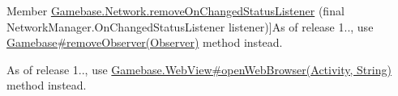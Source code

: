 \begin{DoxyRefList}
%
Member \hyperlink{classcom_1_1toast_1_1android_1_1gamebase_1_1_gamebase_1_1_network_a295dcc9a385185370586734384c49c43}{Gamebase.Network.remove\+On\+Changed\+Status\+Listener} (final Network\+Manager.\+On\+Changed\+Status\+Listener listener)]As of release 1.., use \hyperlink{classcom_1_1toast_1_1android_1_1gamebase_1_1_gamebase_af13c08393910fc1b5dac3b5209f461c8}{Gamebase\#remove\+Observer(\+Observer)} method instead.  
\item[\label{deprecated__deprecated000005}%
\Hypertarget{deprecated__deprecated000005}%
Member \hyperlink{classcom_1_1toast_1_1android_1_1gamebase_1_1_gamebase_1_1_web_view_af42cb2004ff65ea216d3c3b26211ef34}{Gamebase.Web\+View.show\+Web\+Browser} ( final Activity activity,  final String url)]As of release 1.., use \hyperlink{}{Gamebase.\+Web\+View\#open\+Web\+Browser(\+Activity, String)} method instead. 
\end{DoxyRefList}